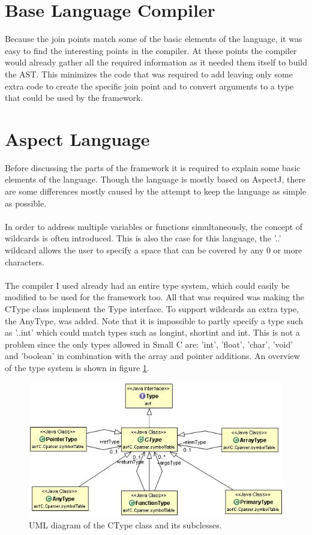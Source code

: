 \documentclass[a4paper]{report}
\begin{document}
\section{Base Language Compiler}
Because the join points match some of the basic elements of the language, it was easy to find the interesting points in the compiler. At these points the compiler would already gather all the required information as it needed them itself to build the AST. This minimizes the code that was required to add leaving only some extra code to create the specific join point and to convert arguments to a type that could be used by the framework.

\section{Aspect Language}
Before discussing the parts of the framework it is required to explain some basic elements of the language. Though the language is mostly based on AspectJ, there are some differences mostly caused by the attempt to keep the language as simple as possible.\\
\\
In order to address multiple variables or functions simultaneously, the concept of wildcards is often introduced. This is also the case for this language, the '..' wildcard allows the user to specify a space that can be covered by any 0 or more characters.\\
\\
The compiler I used already had an entire type system, which could easily be modified to be used for the framework too. All that was required was making the CType class implement the Type interface. To support wildcards an extra type, the AnyType, was added. Note that it is impossible to partly specify a type such as '..int' which could match types such as longint, shortint and int. This is not a problem since the only types allowed in Small C are: 'int', 'float', 'char', 'void' and 'boolean' in combination with the array and pointer additions. An overview of the type system is shown in figure \ref{fig:CType}.\\
\begin{figure}[h!]
\centering
\includegraphics[scale=0.7]{images/AOFC/CType.jpg}
\caption{UML diagram of the CType class and its subclesses.}
\label{fig:CType}
\end{figure}
\end{document}
